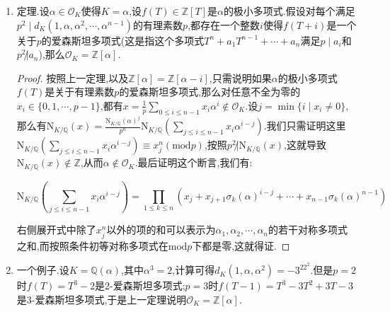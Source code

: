 \begin{enumerate}
\begin{proof}
    	反过来假设存在这组不全为零的$x_i\in\{0,1,2,\cdots,p-1\}$使得$\sum_ix_ib_i\in p\mathscr{O}_K$,那么$C$在$\mathrm{mod}p$下的像$\overline{C}$存在非零解,于是$\det C$被$p$整除,于是$\{b_1,b_2,\cdots,b_n\}$不是一组整基.
    \end{proof}
    \item 定理.设$\alpha\in\mathscr{O}_K$使得$K=\mathbb{\alpha}$,设$f(T)\in\mathbb{Z}[T]$是$\alpha$的极小多项式.假设对每个满足$p^2\mid d_K(1,\alpha,\alpha^2,\cdots,\alpha^{n-1})$的有理素数$p$,都存在一个整数$i$使得$f(T+i)$是一个关于$p$的爱森斯坦多项式(这是指这个多项式$T^n+a_1T^{n-1}+\cdots+a_n$满足$p\mid a_i$和$p^2\not| a_n$),那么$\mathscr{O}_K=\mathbb{Z}[\alpha]$.
    \begin{proof}
    	
    	按照上一定理,以及$\mathbb{Z}[\alpha]=\mathbb{Z}[\alpha-i]$,只需说明如果$\alpha$的极小多项式$f(T)$是关于有理素数$p$的爱森斯坦多项式,那么对任意不全为零的$x_i\in\{0,1,\cdots,p-1\}$,都有$x=\frac{1}{p}\sum_{0\le i\le n-1}x_i\alpha^i\not\in\mathscr{O}_K$.设$j=\min\{i\mid x_i\not=0\}$,那么有$\mathrm{N}_{K/\mathbb{Q}}(x)=\frac{\mathrm{N}_{K/\mathbb{Q}}(\alpha)^j}{p^n}\mathrm{N}_{K/\mathbb{Q}}(\sum_{j\le i\le n-1}x_i\alpha^{i-j})$.我们只需证明这里$\mathrm{N}_{K/\mathbb{Q}}(\sum_{j\le i\le n-1}x_i\alpha^{i-j})\equiv x_j^n(\mathrm{mod}p)$,按照$p^2\not|\mathrm{N}_{K/\mathbb{Q}}(x)$,这就导致$\mathrm{N}_{K/\mathbb{Q}}(x)\not\in\mathbb{Z}$,从而$\alpha\not\in\mathscr{O}_K$.最后证明这个断言,我们有:
    	
    	$$\mathrm{N}_{K/\mathbb{Q}}(\sum_{j\le i\le n-1}x_i\alpha^{i-j})=\prod_{1\le k\le n}\left(x_j+x_{j+1}\sigma_k(\alpha)^{i-j}+\cdots+x_{n-1}\sigma_k(\alpha)^{n-1}\right)$$
    	
    	右侧展开式中除了$x_j^n$以外的项的和可以表示为$\alpha_1,\alpha_2,\cdots,\alpha_n$的若干对称多项式之和,而按照条件初等对称多项式在$\mathrm{mod}p$下都是零,这就得证.
    \end{proof}
    \item 一个例子.设$K=\mathbb{Q}(\alpha)$,其中$\alpha^3=2$,计算可得$d_K(1,\alpha,\alpha^2)=-3^22^2$.但是$p=2$时$f(T)=T^3-2$是2-爱森斯坦多项式;$p=3$时$f(T-1)=T^3-3T^2+3T-3$是3-爱森斯坦多项式,于是上一定理说明$\mathscr{O}_K=\mathbb{Z}[\alpha]$.
\end{enumerate}

